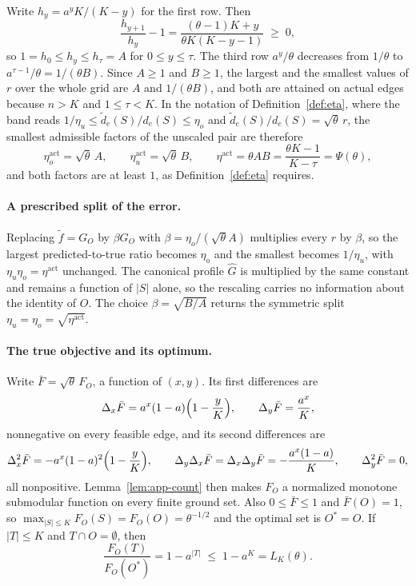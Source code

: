Write $h_y=a^{y}K/(K-y)$ for the first row.  Then
\[
  \frac{h_{y+1}}{h_y}-1=\frac{(\theta-1)K+y}{\theta K(K-y-1)}\;\ge\;0 ,
\]
so $1=h_0\le h_y\le h_\tau=A$ for $0\le y\le\tau$.  The third row
$a^{y}/\theta$ decreases from $1/\theta$ to $a^{\tau-1}/\theta=1/(\theta B)$.
Since $A\ge1$ and $B\ge1$, the largest and the smallest values of $r$ over the
whole grid are $A$ and $1/(\theta B)$, and both are attained on actual edges
because $n>K$ and $1\le\tau<K$.  In the notation of Definition~\ref{def:eta},
where the band reads $1/\eta_u\le\tilde d_e(S)/d_e(S)\le\eta_o$ and
$\tilde d_e(S)/d_e(S)=\sqrt\theta\,r$, the smallest admissible factors of the
unscaled pair are therefore
\[
  \eta_o^{\mathrm{act}}=\sqrt\theta\,A,\qquad
  \eta_u^{\mathrm{act}}=\sqrt\theta\,B,\qquad
  \eta^{\mathrm{act}}=\theta AB=\frac{\theta K-1}{K-\tau}=\Psi(\theta) ,
\]
and both factors are at least $1$, as Definition~\ref{def:eta} requires.

\paragraph{A prescribed split of the error.}
Replacing $\tilde f=G_O$ by $\beta G_O$ with $\beta=\eta_o/(\sqrt\theta A)$
multiplies every $r$ by $\beta$, so the largest predicted-to-true ratio becomes
$\eta_o$ and the smallest becomes $1/\eta_u$, with
$\eta_u\eta_o=\eta^{\mathrm{act}}$ unchanged.  The canonical profile $\hat G$
is multiplied by the same constant and remains a function of $|S|$ alone, so
the rescaling carries no information about the identity of $O$.  The choice
$\beta=\sqrt{B/A}$ returns the symmetric split
$\eta_u=\eta_o=\sqrt{\eta^{\mathrm{act}}}$.

\paragraph{The true objective and its optimum.}
Write $\bar F=\sqrt\theta\,F_O$, a function of $(x,y)$.  Its first differences
are
\[
  \Delta_x\bar F=a^{x}(1-a)\Bigl(1-\frac yK\Bigr),\qquad
  \Delta_y\bar F=\frac{a^{x}}{K},
\]
nonnegative on every feasible edge, and its second differences are
\[
  \Delta_x^{2}\bar F=-a^{x}(1-a)^{2}\Bigl(1-\frac yK\Bigr),\qquad
  \Delta_y\Delta_x\bar F=\Delta_x\Delta_y\bar F=-\frac{a^{x}(1-a)}{K},\qquad
  \Delta_y^{2}\bar F=0,
\]
all nonpositive.  Lemma~\ref{lem:app-count} then makes $F_O$ a normalized
monotone submodular function on every finite ground set.  Also
$0\le\bar F\le1$ and $\bar F(O)=1$, so $\max_{|S|\le K}F_O(S)=F_O(O)=\theta^{-1/2}$ and the optimal
set is $O^{\ast}=O$.  If $|T|\le K$ and $T\cap O=\emptyset$, then
\[
  \frac{F_O(T)}{F_O(O^{\ast})}=1-a^{|T|}\;\le\;1-a^{K}=L_K(\theta).
\]


